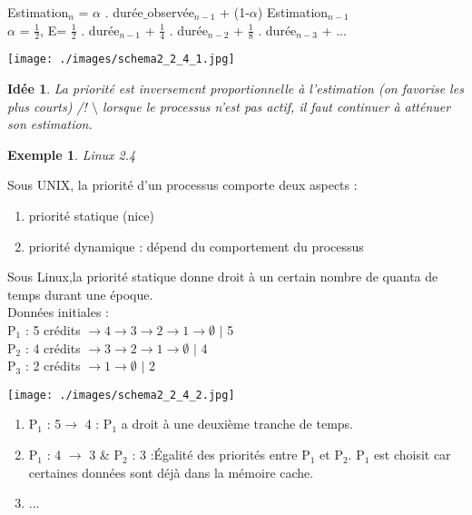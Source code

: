 \documentclass[12pt,a4paper]{report}
\newtheorem*{ex}{Exemple}
\newtheorem*{id}{Idée}
\begin{document}
Estimation$_n$ = $\alpha$ . durée$\_$observée$_{n-1}$ + (1-$\alpha$) Estimation$_{n-1}$\\

$\alpha$ = $\frac{1}{2}$,  E= $\frac{1}{2}$ . durée$_{n-1}$ + $\frac{1}{4}$  . durée$_{n-2}$ + $\frac{1}{8}$ . durée$_{n-3}$ + ...

\begin{center}
\texttt{[image: ./images/schema2\_2\_4\_1.jpg]}
\end{center}
\begin{id} La priorité est inversement proportionnelle à l'estimation (on favorise les plus courts) {\large /! $\setminus$} lorsque le processus n'est pas actif, il faut continuer à atténuer son estimation.\end{id}

\begin{ex} Linux 2.4\end{ex}

Sous UNIX, la priorité d'un processus comporte deux aspects :
\begin{enumerate}
\item priorité statique (nice)
\item priorité dynamique : dépend du comportement du processus
\end{enumerate}


Sous Linux,la priorité statique donne droit à un certain nombre de quanta de temps durant une époque.\\

Données initiales : \\
P$_1$ : 5 crédits \textbf{$\rightarrow 4 \rightarrow 3 \rightarrow 2 \rightarrow 1 \rightarrow \emptyset$} \hspace*{1cm} $\mid$ 5\\
P$_2$ : 4 crédits \textbf{$\rightarrow 3 \rightarrow 2 \rightarrow 1 \rightarrow \emptyset$} \hspace*{1.88cm} $\mid$ 4\\
P$_3$ : 2 crédits \textbf{$\rightarrow 1 \rightarrow \emptyset$} \hspace*{3.6cm} $\mid$ 2
\begin{center}
\texttt{[image: ./images/schema2\_2\_4\_2.jpg]}
\end{center}

\begin{enumerate}
\item P$_1$ : 5$\rightarrow$ 4 : P$_1$ a droit à une deuxième tranche de temps.
\item P$_1$ : 4 $\rightarrow$ 3 \& P$_2$ : 3 :Égalité des priorités entre P$_1$ et P$_2$. P$_1$ est choisit car certaines données sont déjà dans la mémoire cache.
\item ...\\
\end{enumerate}
\end{document}
